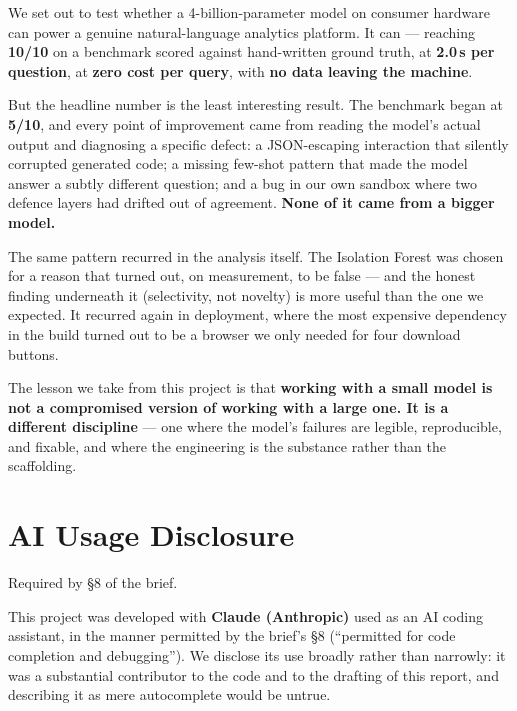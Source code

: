 \documentclass[11pt,a4paper]{article}
\newcommand{\note}[1]{\textcolor{muted}{\small #1}}
\begin{document}
We set out to test whether a 4-billion-parameter model on consumer hardware can power a
genuine natural-language analytics platform. It can --- reaching \textbf{10/10} on a
benchmark scored against hand-written ground truth, at \textbf{2.0\,s per question}, at
\textbf{zero cost per query}, with \textbf{no data leaving the machine}.

But the headline number is the least interesting result. The benchmark began at
\textbf{5/10}, and every point of improvement came from reading the model's actual
output and diagnosing a specific defect: a JSON-escaping interaction that silently
corrupted generated code; a missing few-shot pattern that made the model answer a subtly
different question; and a bug in our own sandbox where two defence layers had drifted out
of agreement. \textbf{None of it came from a bigger model.}

The same pattern recurred in the analysis itself. The Isolation Forest was chosen for a
reason that turned out, on measurement, to be false --- and the honest finding underneath
it (selectivity, not novelty) is more useful than the one we expected. It recurred again
in deployment, where the most expensive dependency in the build turned out to be a
browser we only needed for four download buttons.

The lesson we take from this project is that \textbf{working with a small model is not a
compromised version of working with a large one. It is a different discipline} --- one
where the model's failures are legible, reproducible, and fixable, and where the
engineering is the substance rather than the scaffolding.

\section{AI Usage Disclosure}

\note{Required by \S8 of the brief.}

\vspace{0.2cm}
This project was developed with \textbf{Claude (Anthropic)} used as an AI coding
assistant, in the manner permitted by the brief's \S8 (``permitted for code completion and
debugging''). We disclose its use broadly rather than narrowly: it was a substantial
contributor to the code and to the drafting of this report, and describing it as mere
autocomplete would be untrue.
\end{document}
